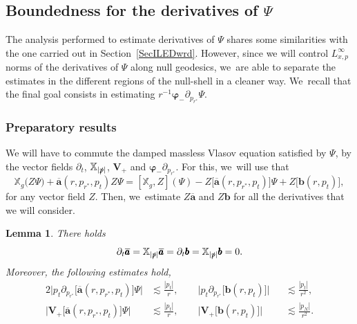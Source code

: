 \documentclass[JEP,XML,SOM,Unicode,published]{cedram}
\theoremstyle{plain}
\newtheorem{lemma}[proposition]{Lemma}
\theoremstyle{definition}
\newcommand\T{{\mathbb{X}}}
\begin{document}
\subsection{Boundedness for the derivatives of $\Psi$}

The analysis performed to estimate derivatives of $\Psi$ shares some similarities with the one carried out in Section~\ref{SecILEDwrd}. However, since we will control $L^\infty_{x,p}$ norms of the derivatives of $\Psi$ along null geodesics, we~are able to separate the estimates in the different regions of the null-shell in a cleaner way. We~recall that the final goal consists in estimating $r^{-1}\pmb{\varphi}_- \partial_{p_{r^*}} \Psi$.

\subsubsection{Preparatory results}
We will have to commute the damped massless Vlasov equation satisfied by $\Psi$, by the vector fields $\partial_t$, $\T_{|\slashed{p}|}$, $\pmb{V}_{\! +}$ and $ \pmb{ \varphi}_- \partial_{p_{r^*}}$. For this, we~will use that
\begin{equation}\label{eq:ComZ}
\T_g \bigl(Z \Psi \bigr)+ \overline{\pmb{a}}(r,p_{r^*},p_t) Z \Psi = [\T_g,Z] (\Psi)- Z \bigl[\overline{\pmb{a}}(r,p_{r^*},p_t) \bigr] \Psi+Z \bigl[\pmb{b} (r,p_t) \bigr],
\end{equation}
for any vector field $Z$. Then, we~estimate $Z\overline{\pmb{a}}$ and $Z\pmb{b}$ for all the derivatives that we will consider.

\begin{lemma}\label{Lemsourcetermesti}
There holds
\[
\partial_t \overline{\pmb{a}}=\T_{|\slashed{p}|} \overline{\pmb{a}}= \partial_t \pmb{b}=\T_{|\slashed{p}|} \pmb{b}=0.
\]
Moreover, the following estimates hold,
\begin{alignat*}{2}
\big| p_t \partial_{p_{r^*}} \bigl[ \overline{\pmb{a}} (r,p_{r^*},p_t) \bigr] \Psi \big| & \lesssim \frac{|p_t|}{r},\qquad \big| p_t \partial_{p_{r^*}} \bigl[ \pmb{b} (r,p_t) \bigr] \big| && \lesssim \frac{|p_t|}{r^2}, \\
\big| \pmb{V}_+ \bigl[ \overline{\pmb{a}} (r,p_{r^*},p_t) \bigr] \Psi \big| & \lesssim \frac{|p_t|}{r},\qquad \big| \pmb{V}_+ \bigl[ \pmb{b} (r,p_t) \bigr] \big| &&\lesssim \frac{|p_N|}{r^2}.
\end{alignat*}
\end{lemma}
\end{document}

